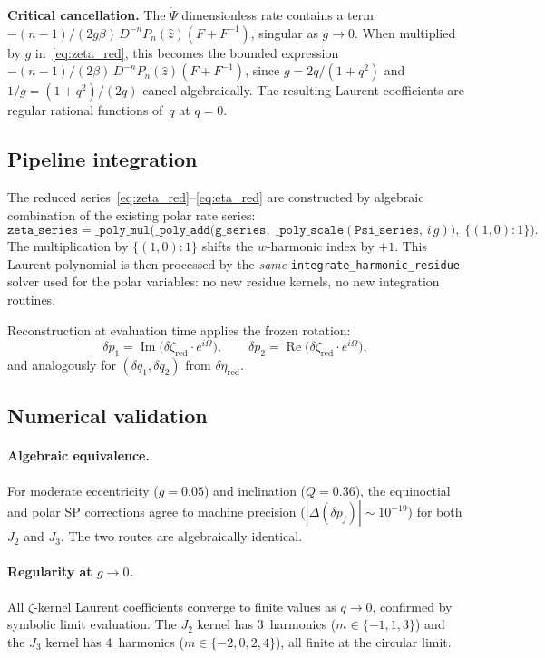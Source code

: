 \documentclass[11pt]{article}
\begin{document}
\textbf{Critical cancellation.}
The $\dot\Psi$ dimensionless rate contains a term
$-(n-1)/(2g\beta)\,D^{-n}P_n(\hat z)(F + F^{-1})$, singular as $g \to 0$.
When multiplied by $g$ in~\eqref{eq:zeta_red}, this becomes the bounded
expression $-(n-1)/(2\beta)\,D^{-n}P_n(\hat z)(F + F^{-1})$, since
$g = 2q/(1+q^2)$ and $1/g = (1+q^2)/(2q)$ cancel algebraically.
The resulting Laurent coefficients are regular rational functions
of~$q$ at $q = 0$.

\subsection{Pipeline integration}

The reduced series~\eqref{eq:zeta_red}--\eqref{eq:eta_red} are constructed
by algebraic combination of the existing polar rate series:
\[
\texttt{zeta\_series} = \texttt{\_poly\_mul}\!\Big(
  \texttt{\_poly\_add}\big(\texttt{g\_series},\;
  \texttt{\_poly\_scale}(\texttt{Psi\_series},\, i\,g)\big),\;
  \{(1,0): 1\}
\Big).
\]
The multiplication by $\{(1,0): 1\}$ shifts the $w$-harmonic index by $+1$.
This Laurent polynomial is then processed by the \emph{same}
\texttt{integrate\_harmonic\_residue} solver used for the polar variables:
no new residue kernels, no new integration routines.

Reconstruction at evaluation time applies the frozen rotation:
\[
\delta p_1 = \operatorname{Im}\!\big(\delta\zeta_{\mathrm{red}}
  \cdot e^{i\Omega}\big),
\qquad
\delta p_2 = \operatorname{Re}\!\big(\delta\zeta_{\mathrm{red}}
  \cdot e^{i\Omega}\big),
\]
and analogously for $(\delta q_1, \delta q_2)$ from $\delta\eta_{\mathrm{red}}$.

\subsection{Numerical validation}

\paragraph{Algebraic equivalence.}
For moderate eccentricity ($g = 0.05$) and inclination ($Q = 0.36$), the
equinoctial and polar SP corrections agree to machine precision
($|\Delta(\delta p_j)| \sim 10^{-19}$) for both $J_2$ and $J_3$. The two
routes are algebraically identical.

\paragraph{Regularity at $g \to 0$.}
All $\zeta$-kernel Laurent coefficients converge to finite values as
$q \to 0$, confirmed by symbolic limit evaluation. The $J_2$ kernel
has 3~harmonics ($m \in \{-1, 1, 3\}$) and the $J_3$ kernel has
4~harmonics ($m \in \{-2, 0, 2, 4\}$), all finite at the circular limit.
\end{document}
